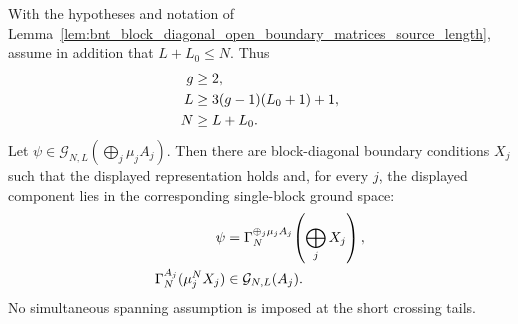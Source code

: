 \begin{lemma}
    \label{thm:block_diagonal_boundary_periodic_components_from_global_cut}
    \leanok
    With the hypotheses and notation of
    Lemma~\ref{lem:bnt_block_diagonal_open_boundary_matrices_source_length},
    assume in addition that $L+L_0\le N$. Thus
    \begin{align}
        g
         & \ge2,
        \notag                 \\
        L
         & \ge3(g-1)(L_0+1)+1,
        \notag                 \\
        N
         & \ge L+L_0.
        \notag
    \end{align}
    Let $\psi\in\mathcal G_{N,L}(\bigoplus_j\mu_jA_j)$. Then there are
    block-diagonal boundary conditions $X_j$ such that the displayed
    representation holds and, for every $j$, the displayed component lies in
    the corresponding single-block ground space:
    \begin{align}
        \psi
         & =
        \Gamma_N^{\oplus_j\mu_jA_j}\!\left(\bigoplus_jX_j\right),
        \notag                       \\
        \Gamma_N^{A_j}(\mu_j^NX_j)
         & \in\mathcal G_{N,L}(A_j).
        \notag
    \end{align}
    No simultaneous spanning assumption is imposed at the short crossing
    tails.
\end{lemma}

